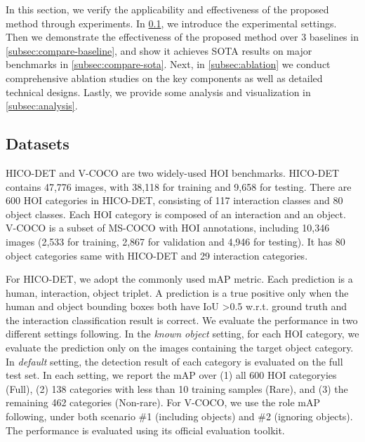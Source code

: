 \documentclass[10pt,twocolumn,letterpaper]{article}
\begin{document}
In this section, we verify the applicability and effectiveness of the proposed method through experiments. In \cref{subsec:exp-setup}, we introduce the experimental settings. Then we demonstrate the effectiveness of the proposed method over 3 baselines in \cref{subsec:compare-baseline}, and show it achieves SOTA results on major benchmarks in \cref{subsec:compare-sota}. Next, in \cref{subsec:ablation} we conduct comprehensive ablation studies on the key components as well as detailed technical designs. Lastly, we provide some analysis and visualization in \cref{subsec:analysis}.

\subsection{Datasets}
\label{subsec:exp-setup}

HICO-DET\cite{chao2018learning} and V-COCO\cite{gupta2015visual} are two widely-used HOI benchmarks. HICO-DET contains 47,776 images, with 38,118 for training and 9,658 for testing. There are 600 HOI categories in HICO-DET, consisting of 117 interaction classes and 80 object classes. Each HOI category is composed of an interaction and an object. V-COCO is a subset of MS-COCO\cite{lin2014microsoft} with HOI annotations, including 10,346 images (2,533 for training, 2,867 for validation and 4,946 for testing). It has 80 object categories same with HICO-DET and 29 interaction categories.

For HICO-DET, we adopt the commonly used mAP metric\cite{chao2018learning}. Each prediction is a \textlangle{}human, interaction, object\textrangle{} triplet. A prediction is a true positive only when the human and object bounding boxes both have IoU \textgreater 0.5 w.r.t. ground truth and the interaction classification result is correct. We evaluate the performance in two different settings following\cite{chao2018learning}. In the \textit{known object} setting, for each HOI category, we evaluate the prediction only on the images containing the target object category. In \textit{default} setting, the detection result of each category is evaluated on the full test set. In each setting, we report the mAP over (1) all 600 HOI categoryies (Full), (2) 138 categories with less than 10 training samples (Rare), and (3) the remaining 462 categories (Non-rare). For V-COCO, we use the role mAP following\cite{gupta2015visual}, under both scenario \#1 (including objects) and \#2 (ignoring objects). The performance is evaluated using its official evaluation toolkit.
\end{document}
